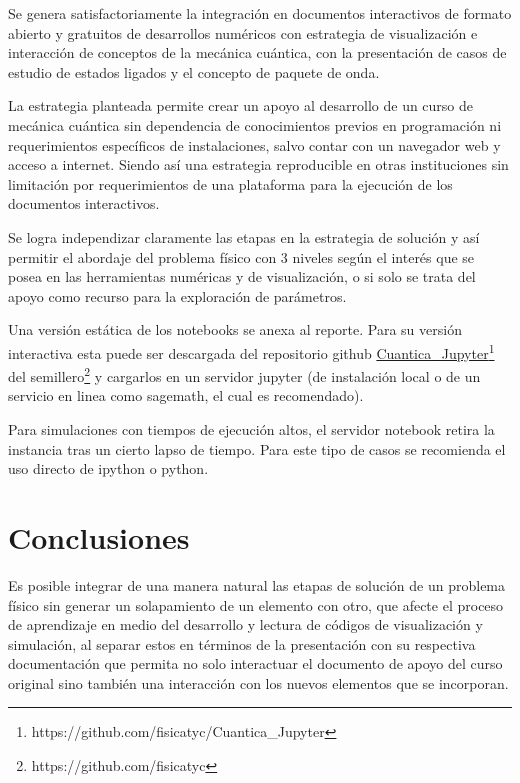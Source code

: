 \documentclass{article}
\begin{document}
Se genera satisfactoriamente la integración en documentos interactivos de formato abierto y gratuitos de desarrollos numéricos con estrategia de visualización e interacción de conceptos de la mecánica cuántica, con la presentación de casos de estudio de estados ligados y el concepto de paquete de onda.

La estrategia planteada permite crear un apoyo al desarrollo de un curso de mecánica cuántica sin dependencia de conocimientos previos en programación ni requerimientos específicos de instalaciones, salvo contar con un navegador web y acceso a internet. Siendo así una estrategia reproducible en otras instituciones sin limitación por requerimientos de una plataforma para la ejecución de los documentos interactivos.

Se logra independizar claramente las etapas en la estrategia de solución y así permitir el abordaje del problema físico con 3 niveles según el interés que se posea en las herramientas numéricas y de visualización, o si solo se trata del apoyo como recurso para la exploración de parámetros.

Una versión estática de los notebooks se anexa al reporte. Para su versión interactiva esta puede ser descargada del repositorio github \href{https://github.com/fisicatyc/Cuantica\_Jupyter}{Cuantica\_Jupyter}\footnote{https://github.com/fisicatyc/Cuantica\_Jupyter} del semillero\footnote{https://github.com/fisicatyc} y cargarlos en un servidor jupyter (de instalación local o de un servicio en linea como sagemath, el cual es recomendado).

Para simulaciones con tiempos de ejecución altos, el servidor notebook retira la instancia tras un cierto lapso de tiempo. Para este tipo de casos se recomienda el uso directo de ipython o python.

\section{Conclusiones}

Es posible integrar de una manera natural las etapas de solución de un problema físico sin generar un solapamiento de un elemento con otro, que afecte el proceso de aprendizaje en medio del desarrollo y lectura de códigos de visualización y simulación, al separar estos en términos de la presentación con su respectiva documentación que permita no solo interactuar el documento de apoyo del curso original sino también una interacción con los nuevos elementos que se incorporan.
\end{document}
